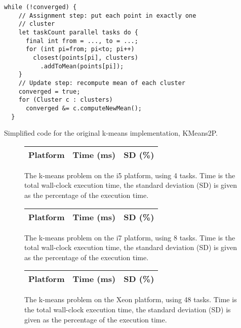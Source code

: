 \begin{code}
\begin{Verbatim}[frame=single]
  while (!converged) {
    // Assignment step: put each point in exactly one
    // cluster
    let taskCount parallel tasks do {
      final int from = ..., to = ...;
      for (int pi=from; pi<to; pi++)
        closest(points[pi], clusters)
          .addToMean(points[pi]);
    }
    // Update step: recompute mean of each cluster
    converged = true;
    for (Cluster c : clusters)
      converged &= c.computeNewMean();
  }

\end{Verbatim}
	\caption{Simplified code for the original k-means implementation, KMeans2P.}
\end{code}
\begin{figure}[hbtp]
	\centering
	\begin{tabular}{l r r}
		\hline
		\hline
		Platform & Time (ms) & SD (\%) \\
		\hline
		
		\hline
		\hline
	\end{tabular}
	\caption{The k-means problem on the i5 platform, using 4 tasks. Time is
	the total wall-clock execution time, the standard deviation (SD) is
	given as the percentage of the execution time.}
	\label{table:kmeans-i5}
\end{figure}

\begin{figure}[hbtp]
	\centering
	\begin{tabular}{l r r}
		\hline
		\hline
		Platform & Time (ms) & SD (\%) \\
		\hline
		
		\hline
		\hline
	\end{tabular}
	\caption{The k-means problem on the i7 platform, using 8 tasks.  Time is
	the total wall-clock execution time, the standard deviation (SD) is
	given as the percentage of the execution time.}
	\label{table:kmeans-i7}
\end{figure}

\begin{figure}[hbtp]
	\centering
	\begin{tabular}{l r r}
		\hline
		\hline
		Platform & Time (ms) & SD (\%) \\
		\hline
		
		\hline
		\hline
	\end{tabular}
	\caption{The k-means problem on the Xeon platform, using 48 tasks.
	Time is the total wall-clock execution time, the standard deviation (SD)
	is given as the percentage of the execution time.}
	\label{table:kmeans-xeon}
\end{figure}

